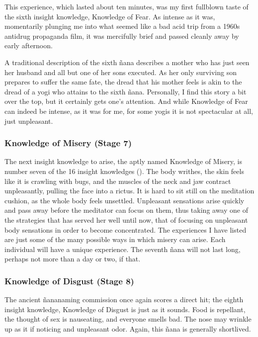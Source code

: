 \documentclass[a5paper,10pt,english]{book}
\begin{document}
\sphinxAtStartPar
This experience, which lasted about ten minutes, was my first full\sphinxhyphen{}blown
taste of the sixth insight knowledge, Knowledge of Fear. As intense as
it was, momentarily plunging me into what seemed like a bad acid trip
from a 1960s anti\sphinxhyphen{}drug propaganda film, it was mercifully brief and
passed cleanly away by early afternoon.

\sphinxAtStartPar
A traditional description of the sixth ñana describes a mother who has
just seen her husband and all but one of her sons executed. As her only
surviving son prepares to suffer the same fate, the dread that his
mother feels is akin to the dread of a yogi who attains to the sixth
ñana. Personally, I find this story a bit over the top, but it certainly
gets one’s attention. And while Knowledge of Fear can indeed be intense,
as it was for me, for some yogis it is not spectacular at all, just
unpleasant.


\subsubsection{Knowledge of Misery (Stage 7)}
\label{\detokenize{main-2:knowledge-of-misery-stage-7}}
\sphinxAtStartPar
The next insight knowledge to arise, the aptly named Knowledge of
Misery, is number seven of the 16 insight knowledges (). The body
writhes, the skin feels like it is crawling with bugs, and the muscles
of the neck and jaw contract unpleasantly, pulling the face into a
rictus. It is hard to sit still on the meditation cushion, as the whole
body feels unsettled. Unpleasant sensations arise quickly and pass away
before the meditator can focus on them, thus taking away one of the
strategies that has served her well until now, that of focusing on
unpleasant body sensations in order to become concentrated. The
experiences I have listed are just some of the many possible ways in
which misery can arise. Each individual will have a unique experience.
The seventh ñana will not last long, perhaps not more than a day or two,
if that.


\subsubsection{Knowledge of Disgust (Stage 8)}
\label{\detokenize{main-2:knowledge-of-disgust-stage-8}}
\sphinxAtStartPar
The ancient ñana\sphinxhyphen{}naming commission once again scores a direct hit; the
eighth insight knowledge, Knowledge of Disgust is just as it sounds.
Food is repellant, the thought of sex is nauseating, and everyone smells
bad. The nose may wrinkle up as it if noticing and unpleasant odor.
Again, this ñana is generally short\sphinxhyphen{}lived.
\end{document}
